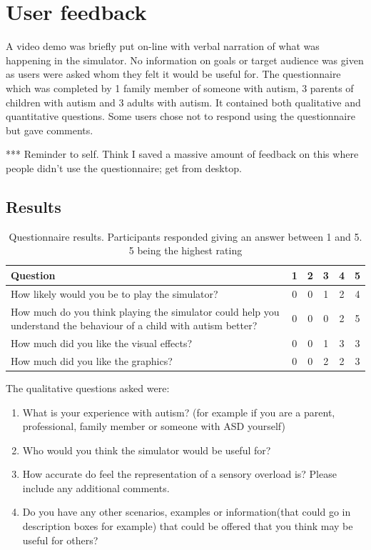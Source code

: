 \documentclass[11pt]{report}
\begin{document}
\section{User feedback}
A video demo was briefly put on-line with verbal narration of what was happening in the simulator. No information on goals or target audience was given as users were asked whom they felt it would be useful for. The questionnaire which was completed by 1 family member of someone with autism, 3 parents of children with autism and 3 adults with autism. It contained both qualitative and quantitative questions. Some users chose not to respond using the questionnaire but gave comments. 

*** Reminder to self. Think I saved a massive amount of feedback on this where people didn't use the questionnaire; get from desktop.

\subsection{Results}

\begin{table}[H]
\caption{Questionnaire results. Participants responded giving an answer between 1 and 5. 5 being the highest rating}
\begin{tabular}{| p{9cm} | c c c c c |}
\hline
\textbf{Question} & 1 & 2 & 3 & 4 & 5 \\
\hline
How likely would you be to play the simulator? & 0 & 0 & 1 & 2 & 4 \\
\hline
How much do you think playing the simulator could help you understand the behaviour of a child with autism better? & 0 & 0 & 0 & 2 & 5 \\
\hline
How much did you like the visual effects? & 0 & 0 & 1 & 3 & 3 \\
\hline
How much did you like the graphics? & 0 & 0 & 2 & 2 & 3 \\ 
\hline
\end{tabular}
\end{table}

The qualitative questions asked were:
\begin{enumerate}
\item What is your experience with autism? (for example if you are a parent, professional, family member or someone with ASD yourself)
\item Who would you think the simulator would be useful for?
\item How accurate do feel the representation of a sensory overload is? Please include any additional comments.
\item Do you have any other scenarios, examples or information(that could go in description boxes for example) that could be offered that you think may be useful for others?
\end{enumerate}
\end{document}
